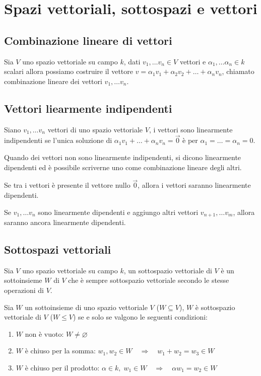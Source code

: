 \documentclass[a4paper]{article}
\begin{document}
\newpage


\section{Spazi vettoriali, sottospazi e vettori}
\subsection{Combinazione lineare di vettori}
Sia \(V\) uno spazio vettoriale su campo \(k\), dati \(v_1, \dots v_n \in V\) vettori e \(\alpha_1, \dots \alpha_n \in k\) scalari
allora possiamo costruire il vettore \(v = \alpha_1 v_1 + \alpha_2 v_2 + \dots + \alpha_n v_n\), chiamato combinazione lineare dei
vettori \(v_1, \dots v_n\).

\subsection{Vettori liearmente indipendenti}
Siano \(v_1, \dots v_n\) vettori di uno spazio vettoriale \(V\), i vettori sono linearmente indipendenti se l'unica soluzione di
\(\alpha_1 v_1 + \dots + \alpha_n v_n = \vec{0}\) è per \(\alpha_1 = \dots = \alpha_n = 0\).

Quando dei vettori non sono linearmente indipendenti, si dicono linearmente dipendenti ed è possibile scriverne uno come combinazione
lineare degli altri.

Se tra i vettori è presente il vettore nullo \(\vec{0}\), allora i vettori saranno linearmente dipendenti.

Se \(v_1, \dots v_n\) sono linearmente dipendenti e aggiungo altri vettori \(v_{n+1}, \dots v_m\), allora saranno ancora linearmente
dipendenti.

\subsection{Sottospazi vettoriali}
Sia \(V\) uno spazio vettoriale su campo \(k\), un sottospazio vettoriale di \(V\) è un sottoinsieme \(W\) di \(V\) che è sempre
sottospazio vettoriale secondo le stesse operazioni di \(V\).

Sia \(W\) un sottoinsieme di uno spazio vettoriale \(V\) (\(W \subseteq V\)), \(W\) è sottospazio vettoriale di \(V\) (\(W \leq V\))
se e solo se valgono le seguenti condizioni:
\begin{enumerate}[topsep=3pt, itemsep=0pt]
	\item \(W\) non è vuoto: \(W \neq \varnothing\)
	\item \(W\) è chiuso per la somma: \(w_1, w_2 \in W \quad \Rightarrow \quad w_1 + w_2 = w_3 \in W\)
	\item \(W\) è chiuso per il prodotto: \(\alpha \in k, \; w_1 \in W \quad \Rightarrow \quad \alpha w_1 = w_2 \in W\)
\end{enumerate}
\end{document}
